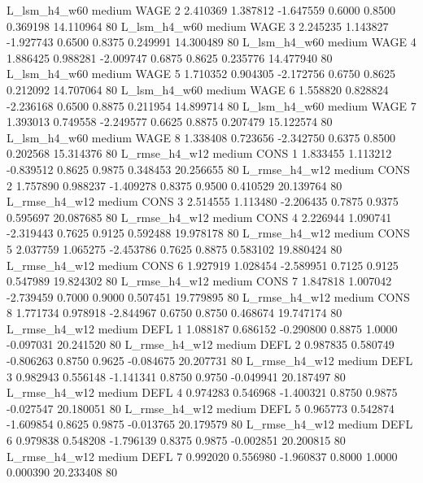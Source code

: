   L_lsm_h4_w60     medium     WAGE                 2  2.410369 1.387812 -1.647559 0.6000 0.8500  0.369198   14.110964 80
  L_lsm_h4_w60     medium     WAGE                 3  2.245235 1.143827 -1.927743 0.6500 0.8375  0.249991   14.300489 80
  L_lsm_h4_w60     medium     WAGE                 4  1.886425 0.988281 -2.009747 0.6875 0.8625  0.235776   14.477940 80
  L_lsm_h4_w60     medium     WAGE                 5  1.710352 0.904305 -2.172756 0.6750 0.8625  0.212092   14.707064 80
  L_lsm_h4_w60     medium     WAGE                 6  1.558820 0.828824 -2.236168 0.6500 0.8875  0.211954   14.899714 80
  L_lsm_h4_w60     medium     WAGE                 7  1.393013 0.749558 -2.249577 0.6625 0.8875  0.207479   15.122574 80
  L_lsm_h4_w60     medium     WAGE                 8  1.338408 0.723656 -2.342750 0.6375 0.8500  0.202568   15.314376 80
 L_rmse_h4_w12     medium     CONS                 1  1.833455 1.113212 -0.839512 0.8625 0.9875  0.348453   20.256655 80
 L_rmse_h4_w12     medium     CONS                 2  1.757890 0.988237 -1.409278 0.8375 0.9500  0.410529   20.139764 80
 L_rmse_h4_w12     medium     CONS                 3  2.514555 1.113480 -2.206435 0.7875 0.9375  0.595697   20.087685 80
 L_rmse_h4_w12     medium     CONS                 4  2.226944 1.090741 -2.319443 0.7625 0.9125  0.592488   19.978178 80
 L_rmse_h4_w12     medium     CONS                 5  2.037759 1.065275 -2.453786 0.7625 0.8875  0.583102   19.880424 80
 L_rmse_h4_w12     medium     CONS                 6  1.927919 1.028454 -2.589951 0.7125 0.9125  0.547989   19.824302 80
 L_rmse_h4_w12     medium     CONS                 7  1.847818 1.007042 -2.739459 0.7000 0.9000  0.507451   19.779895 80
 L_rmse_h4_w12     medium     CONS                 8  1.771734 0.978918 -2.844967 0.6750 0.8750  0.468674   19.747174 80
 L_rmse_h4_w12     medium     DEFL                 1  1.088187 0.686152 -0.290800 0.8875 1.0000 -0.097031   20.241520 80
 L_rmse_h4_w12     medium     DEFL                 2  0.987835 0.580749 -0.806263 0.8750 0.9625 -0.084675   20.207731 80
 L_rmse_h4_w12     medium     DEFL                 3  0.982943 0.556148 -1.141341 0.8750 0.9750 -0.049941   20.187497 80
 L_rmse_h4_w12     medium     DEFL                 4  0.974283 0.546968 -1.400321 0.8750 0.9875 -0.027547   20.180051 80
 L_rmse_h4_w12     medium     DEFL                 5  0.965773 0.542874 -1.609854 0.8625 0.9875 -0.013765   20.179579 80
 L_rmse_h4_w12     medium     DEFL                 6  0.979838 0.548208 -1.796139 0.8375 0.9875 -0.002851   20.200815 80
 L_rmse_h4_w12     medium     DEFL                 7  0.992020 0.556980 -1.960837 0.8000 1.0000  0.000390   20.233408 80
